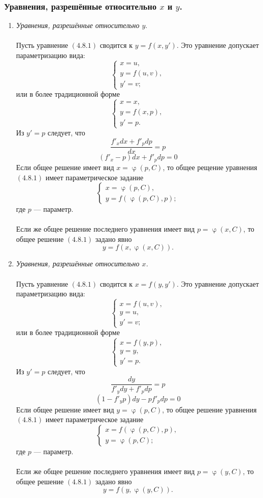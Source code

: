 \documentclass[a4paper, 12pt]{report}
\renewcommand{\varphi}{\upvarphi}
\begin{document}
\subsubsection{Уравнения, разрешённые относительно $x$ и $y$.}
\begin{enumerate}
	\item\textit{ Уравнения, разрешённые относительно $y$}.\\\\
	Пусть уравнение $(4.8.1)$ сводится к $y = f(x, y')$. Это уравнение допускает параметризацию вида:
	$$\begin{cases}
		x = u,\\
		y = f(u, v),\\
		y' = v;
	\end{cases}$$ или в более традиционной форме
	$$\begin{cases}
	x = x,\\
	y = f(x, p),\\
	y' = p.
\end{cases}$$
Из $y' = p$ следует, что
$$\frac{f'_xdx + f'_pdp}{dx} = p$$
$$(f'_x - p)dx + f'_pdp = 0$$
Если общее решение имеет вид $x = \varphi(p, C)$, то общее рещение уравнения $(4.8.1)$ имеет параметрическое задание $$\begin{cases}
	x = \varphi(p, C),\\
	y = f(\varphi(p, C), p);
\end{cases}$$ где $p$ --- параметр.\\\\
Если же общее решение последнего уравнения имеет вид $p = \varphi(x, C)$, то общее решение $(4.8.1)$ задано явно $$y = f(x, \varphi(x, C)).$$
	\item\textit{ Уравнения, разрешённые относительно $x$.}\\\\
	Пусть уравнение $(4.8.1)$ сводится к $x = f(y, y')$. Это уравнение допускает параметризацию вида:
	$$\begin{cases}
		x = f(u, v),\\
		y = u,\\
		y' = v;
	\end{cases}$$ или в более традиционной форме
	$$\begin{cases}
		x = f(y, p),\\
		y = y,\\
		y' = p.
	\end{cases}$$
	Из $y' = p$ следует, что
	$$\frac{dy}{f'_ydy + f'_pdp} = p$$
	$$(1 - f'_yp)dy - pf'_pdp = 0$$
	Если общее решение имеет вид $y = \varphi(p, C)$, то общее решение уравнения $(4.8.1)$ имеет параметрическое задание $$\begin{cases}
		x = f(\varphi(p, C), p),\\
		y =  \varphi(p, C);
	\end{cases}$$ где $p$ --- параметр.\\\\
	Если же общее решение последнего уравнения имеет вид $p = \varphi(y, C)$, то общее решение $(4.8.1)$ задано явно $$y = f(y, \varphi(y, C)).$$
\end{enumerate}
\end{document}
